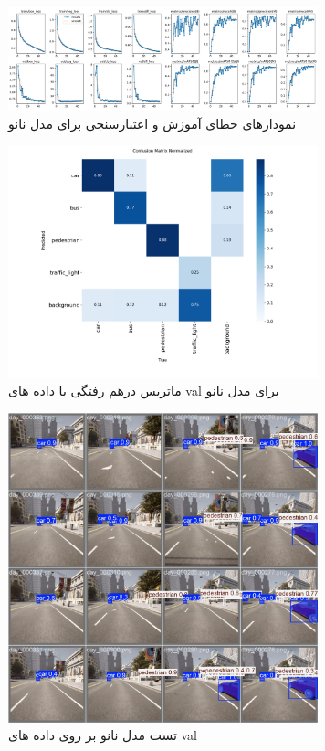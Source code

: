 \documentclass[oneside]{report}
\begin{document}
\begin{figure}[H]
  \centering
  \includegraphics[width=0.8\textwidth]{images/nano/results.png}
  \caption{نمودارهای خطای آموزش و اعتبارسنجی برای مدل‌ نانو}
\end{figure}
\begin{figure}[H]
  \centering
  \includegraphics[width=0.8\textwidth]{images/nano/confusion_matrix_normalized.png}
  \caption{ماتریس درهم رفتگی با داده های val برای مدل نانو}
\end{figure}
\begin{figure}[H]
  \centering
  \includegraphics[width=0.8\textwidth]{images/nano/val_batch2_pred.jpg}
  \caption{تست مدل نانو بر روی داده های val}
\end{figure}
\end{document}

